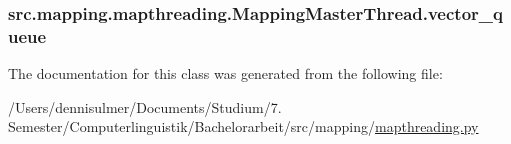 \subsubsection[{\texorpdfstring{vector\+\_\+queue}{vector\_queue}}]{\setlength{\rightskip}{0pt plus 5cm}src.\+mapping.\+mapthreading.\+Mapping\+Master\+Thread.\+vector\+\_\+queue}\hypertarget{classsrc_1_1mapping_1_1mapthreading_1_1_mapping_master_thread_ad7241d90991759aa3f991ac6b3c7262d}{}\label{classsrc_1_1mapping_1_1mapthreading_1_1_mapping_master_thread_ad7241d90991759aa3f991ac6b3c7262d}


The documentation for this class was generated from the following file\+:\begin{DoxyCompactItemize}
\item 
/\+Users/dennisulmer/\+Documents/\+Studium/7. Semester/\+Computerlinguistik/\+Bachelorarbeit/src/mapping/\hyperlink{mapthreading_8py}{mapthreading.\+py}\end{DoxyCompactItemize}
